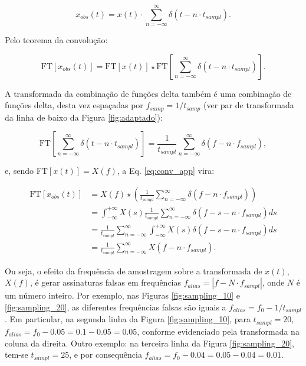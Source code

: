 \begin{equation}
x_{obs}(t) = x(t) \cdot \sum_{n=-\infty}^{\infty}\delta(t - n \cdot t_{sampl}).
\end{equation}

Pelo teorema da convolução:

\begin{equation}
\text{FT}[x_{obs}(t)] = \text{FT}[x(t)] \star \text{FT}[\sum_{n=-\infty}^{\infty}\delta(t - n \cdot t_{sampl})].
\label{eq:conv_app}
\end{equation}

A transformada da combinação de funções delta também é uma combinação de funções delta, desta vez espaçadas por $f_{samp}=1/t_{samp}$ (ver par de transformada da linha de baixo da Figura \ref{fig:adaptado}):

\begin{equation}
\text{FT}[\sum_{n=-\infty}^{\infty}\delta(t - n \cdot t_{sampl})] = \frac{1}{t_{sampl}} \sum_{n=-\infty}^{\infty}\delta(f - n \cdot f_{sampl}),
\end{equation}

e, sendo FT$[x(t)] = X(f)$, a Eq. \ref{eq:conv_app} vira:

\begin{align}
\text{FT}[x_{obs}(t)] &= X(f) \star \left( \frac{1}{t_{sampl}} \sum_{n=-\infty}^{\infty}\delta(f - n \cdot f_{sampl}) \right) \\
 &= \int_{-\infty}^{+\infty} X(s) \frac{1}{t_{sampl}} \sum_{n=-\infty}^{\infty} \delta(f - s - n \cdot f_{sampl}) ds \\
 &= \frac{1}{t_{sampl}}  \sum_{n=-\infty}^{\infty} \int_{-\infty}^{+\infty} X(s) \delta(f - s - n \cdot f_{sampl}) ds \\
 & = \frac{1}{t_{sampl}} \sum_{n=-\infty}^{\infty} X(f - n \cdot f_{sampl}).
\end{align}

Ou seja, o efeito da frequência de amostragem sobre a transformada de $x(t)$, $X(f)$, é gerar assinaturas falsas em frequências $f_{alias} = |f - N \cdot f_{sampl}|$, onde $N$ é um número inteiro. Por exemplo, nas Figuras \ref{fig:sampling_10} e \ref{fig:sampling_20}, as diferentes frequências falsas são iguais a $f_{alias} = f_{0} - 1/t_{sampl}$. Em particular, na segunda linha da Figura \ref{fig:sampling_10}, para $t_{sampl} = 20$, $f_{alias} = f_{0} - 0.05 = 0.1 - 0.05 = 0.05$, conforme evidenciado pela transformada na coluna da direita. Outro exemplo: na terceira linha da Figura \ref{fig:sampling_20}, tem-se  $t_{sampl} = 25$, e por consequência $f_{alias} = f_{0} - 0.04 = 0.05 - 0.04 = 0.01$. 

